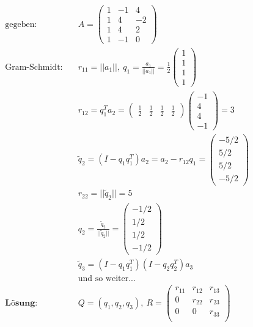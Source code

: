 \documentclass[11pt]{article}
\begin{document}
\begin{equation*}
\begin{split}
	\text{gegeben:} & \quad A = \begin{pmatrix}
  1 & -1 & 4 \\
  1 & 4 & -2 \\
  1 & 4 & 2 \\
  1 & -1 & 0 
  \end{pmatrix} \\
	\text{Gram-Schmidt:} & \quad r_{11} = ||a_1||,\ q_1 = \frac{a_1}{||a_1||} = \frac{1}{2} \begin{pmatrix}1 \\ 1\\ 1\\ 1\end{pmatrix} \\
	& \quad r_{12} = q_1^T a_2 = \begin{pmatrix}\frac{1}{2} &\frac{1}{2} &\frac{1}{2} &\frac{1}{2}\end{pmatrix}\begin{pmatrix}-1\\4\\4\\-1\end{pmatrix} = 3 \\
	& \quad \tilde q_2 = (I - q_1q_1^T)a_2 = a_2 - r_{12}q_1 = \begin{pmatrix}-5/2 \\ 5/2 \\ 5/2 \\ -5/2\end{pmatrix} \\
	& \quad r_{22} = ||\tilde q_2 || = 5 \\
	& \quad q_2 = \frac{\tilde q_2}{||\tilde q_2||} = \begin{pmatrix}-1/2 \\ 1/2 \\ 1/2 \\ -1/2\end{pmatrix} \\
	& \quad \tilde q_3 = (I - q_1q_1^T)(I - q_2q_2^T)a_3 \\
	& \quad \text{und so weiter...} \\
	\textbf{L{\"o}sung:} & \quad Q = (q_1, q_2, q_3),\ R = \begin{pmatrix}
  r_{11} & r_{12} & r_{13} \\
  0 & r_{22} & r_{23} \\
  0 & 0 & r_{33} \\
  \end{pmatrix}
\end{split}
\end{equation*}
\end{document}
